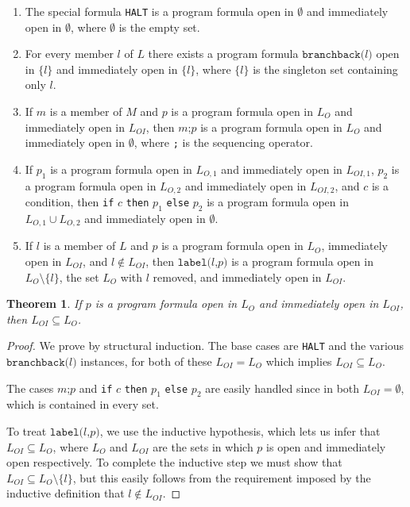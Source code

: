 \documentclass[11pt]{article}
\begin{document}
\begin{enumerate}
\item The special formula \texttt{HALT} is a program formula open in $\emptyset$ and immediately open in $\emptyset$, where $\emptyset$ is the empty set.
\item For every member $l$ of $L$ there exists a program formula $\texttt{branchback(}l\texttt{)}$ open in $\{l\}$ and immediately open in $\{l\}$, where $\{l\}$ is the singleton set containing only $l$.
\item If $m$ is a member of $M$ and $p$ is a program formula open in $L_{O}$ and immediately open in $L_{OI}$, then $m\texttt{;}p$ is a program formula open in $L_{O}$ and immediately open in $\emptyset$, where \texttt{;} is the sequencing operator.
\item If $p_{1}$ is a program formula open in $L_{O,1}$ and immediately open in $L_{OI,1}$, $p_{2}$ is a program formula open in $L_{O,2}$ and immediately open in $L_{OI,2}$, and $c$ is a condition, then \texttt{if} $c$ \texttt{then} $p_{1}$ \texttt{else} $p_{2}$ is a program formula open in $L_{O,1} \cup L_{O,2}$ and immediately open in $\emptyset$.
\item If $l$ is a member of $L$ and $p$ is a program formula open in $L_{O}$, immediately open in $L_{OI}$, and $l \notin L_{OI}$, then $\texttt{label(}l\texttt{,} p\texttt{)}$ is a program formula open in $L_{O} \setminus \{l\}$, the set $L_{O}$ with $l$ removed, and immediately open in $L_{OI}$.
\end{enumerate}

\newtheorem*{immedopencontainedinopen}{Theorem}
\begin{immedopencontainedinopen}
If $p$ is a program formula open in $L_{O}$ and immediately open in $L_{OI}$, then $L_{OI} \subseteq L_{O}$.
\end{immedopencontainedinopen}

\begin{proof}
We prove by structural induction.  The base cases are \texttt{HALT} and the various $\texttt{branchback(}l\texttt{)}$ instances, for both of these $L_{OI} = L_{O}$ which implies $L_{OI} \subseteq L_{O}$.

The cases $m\texttt{;}p$ and \texttt{if} $c$ \texttt{then} $p_{1}$ \texttt{else} $p_{2}$ are easily handled since in both $L_{OI} = \emptyset$, which is contained in every set.

To treat $\texttt{label(}l\texttt{,} p\texttt{)}$, we use the inductive hypothesis, which lets us infer that $L_{OI} \subseteq L_{O}$, where $L_{O}$ and $L_{OI}$ are the sets in which $p$ is open and immediately open respectively.  To complete the inductive step we must show that $L_{OI} \subseteq L_{O} \setminus \{l\}$, but this easily follows from the requirement imposed by the inductive definition that $l \notin L_{OI}$.
\end{proof}
\end{document}

